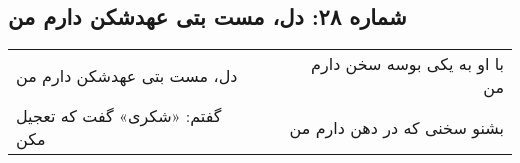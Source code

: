 \begin{center}
\section*{شماره ۲۸: دل، مست بتی عهدشکن دارم من}
\label{sec:028}
\begin{longtable}{l p{0.5cm} r}
دل، مست بتی عهدشکن دارم من
&&
با او به یکی بوسه سخن دارم من
\\
گفتم: «شکری» گفت که تعجیل مکن
&&
بشنو سخنی که در دهن دارم من
\\
\end{longtable}
\end{center}
